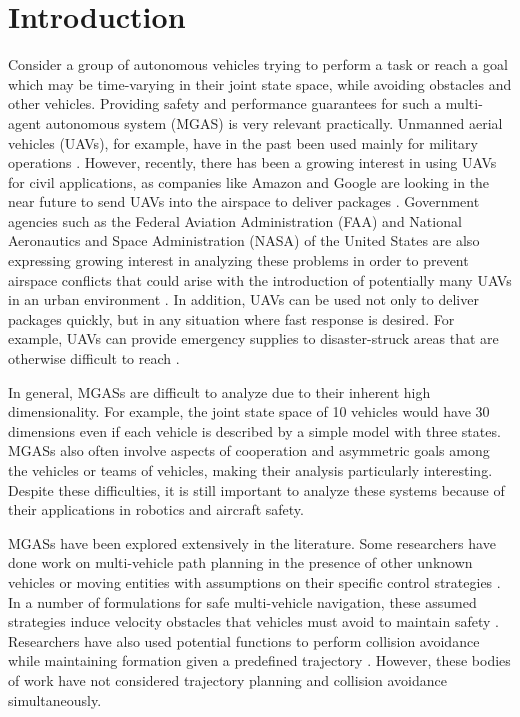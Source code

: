 \documentclass[letterpaper, 10pt, conference]{ieeeconf}      %
\begin{document}
\section{Introduction}
Consider a group of autonomous vehicles trying to perform a task or reach a goal which may be time-varying in their joint state space, while avoiding obstacles and other vehicles. Providing safety and performance guarantees for such a multi-agent autonomous system (MGAS) is very relevant practically. Unmanned aerial vehicles (UAVs), for example, have in the past been used mainly for military operations \cite{tice91}. However, recently, there has been a growing interest in using UAVs for civil applications, as companies like Amazon and Google are looking in the near future to send UAVs into the airspace to deliver packages \cite{primeAir,projectWing}. Government agencies such as the Federal Aviation Administration (FAA) and National Aeronautics and Space Administration (NASA) of the United States are also expressing growing interest in analyzing these problems in order to prevent airspace conflicts that could arise with the introduction of potentially many UAVs in an urban environment \cite{faa13}. In addition, UAVs can be used not only to deliver packages quickly, but in any situation where fast response is desired. For example, UAVs can provide emergency supplies to disaster-struck areas that are otherwise difficult to reach \cite{debusk10}.

In general, MGASs are difficult to analyze due to their inherent high dimensionality. For example, the joint state space of 10 vehicles would have 30 dimensions even if each vehicle is described by a simple model with three states. MGASs also often involve aspects of cooperation and asymmetric goals among the vehicles or teams of vehicles, making their analysis particularly interesting. Despite these difficulties, it is still important to analyze these systems because of their applications in robotics and aircraft safety.

MGASs have been explored extensively in the literature. Some researchers have done work on multi-vehicle path planning in the presence of other unknown vehicles or moving entities with assumptions on their specific control strategies \cite{chasparis05}. In a number of formulations for safe multi-vehicle navigation, these assumed strategies induce velocity obstacles that vehicles must avoid to maintain safety \cite{fiorini98, vandenberg08}. Researchers have also used potential functions to perform collision avoidance while maintaining formation given a predefined trajectory \cite{saber02,chuang07}. However, these bodies of work have not considered trajectory planning and collision avoidance simultaneously.
\end{document}
